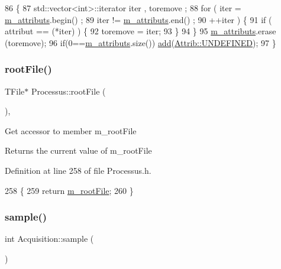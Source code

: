 \begin{DoxyCode}
86                                \{
87     std::vector<int>::iterator iter , toremove ;
88     \textcolor{keywordflow}{for} ( iter  = \hyperlink{classAttrib_ac4bd58a0cc6b38a3b711d609a3d3aacc}{m\_attributs}.begin() ;
89           iter != \hyperlink{classAttrib_ac4bd58a0cc6b38a3b711d609a3d3aacc}{m\_attributs}.end()   ;
90           ++iter ) \{
91       \textcolor{keywordflow}{if} ( attribut == (*iter) ) \{
92         toremove = iter;
93       \}
94     \}
95     \hyperlink{classAttrib_ac4bd58a0cc6b38a3b711d609a3d3aacc}{m\_attributs}.erase (toremove);
96     \textcolor{keywordflow}{if}(0==\hyperlink{classAttrib_ac4bd58a0cc6b38a3b711d609a3d3aacc}{m\_attributs}.size()) \hyperlink{classAttrib_a235f773af19c900264a190b00a3b4ad7}{add}(\hyperlink{classAttrib_a69e171d7cc6417835a5a306d3c764235a3a8da2ab97dda18aebab196fe4100531}{Attrib::UNDEFINED});
97   \}
\end{DoxyCode}
\mbox{\label{classProcessus_a247e8c362ec08422cf53d08dd23b093c}} 
\subsubsection{\texorpdfstring{root\+File()}{rootFile()}}
{\footnotesize\ttfamily T\+File$\ast$ Processus\+::root\+File (\begin{DoxyParamCaption}{ }\end{DoxyParamCaption})\hspace{0.3cm}{\ttfamily [inline]}, {\ttfamily [inherited]}}

Get accessor to member m\+\_\+root\+File \begin{DoxyReturn}{Returns}
the current value of m\+\_\+root\+File 
\end{DoxyReturn}


Definition at line 258 of file Processus.\+h.


\begin{DoxyCode}
258                      \{
259     \textcolor{keywordflow}{return} \hyperlink{classProcessus_a76114f8cf2111e910c323a7ae05a015d}{m\_rootFile};
260   \}
\end{DoxyCode}
\mbox{\label{classAcquisition_a83181975c0746e5837d53933031e7b62}} 
\subsubsection{\texorpdfstring{sample()}{sample()}}
{\footnotesize\ttfamily int Acquisition\+::sample (\begin{DoxyParamCaption}{ }\end{DoxyParamCaption})\hspace{0.3cm}{\ttfamily [inline]}}



